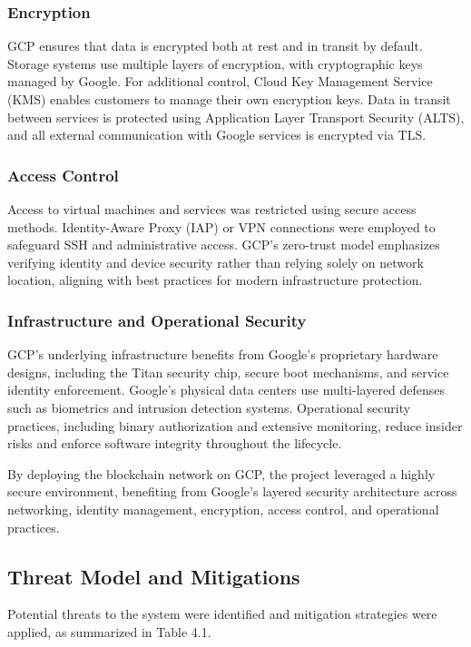 \subsubsection{Encryption}
GCP ensures that data is encrypted both at rest and in transit by default. Storage systems use multiple layers of encryption, with cryptographic keys managed by Google. For additional control, Cloud Key Management Service (KMS) enables customers to manage their own encryption keys. Data in transit between services is protected using Application Layer Transport Security (ALTS), and all external communication with Google services is encrypted via TLS.

\subsubsection{Access Control}
Access to virtual machines and services was restricted using secure access methods. Identity-Aware Proxy (IAP) or VPN connections were employed to safeguard SSH and administrative access. GCP’s zero-trust model emphasizes verifying identity and device security rather than relying solely on network location, aligning with best practices for modern infrastructure protection.

\subsubsection{Infrastructure and Operational Security}
GCP's underlying infrastructure benefits from Google's proprietary hardware designs, including the Titan security chip, secure boot mechanisms, and service identity enforcement. Google's physical data centers use multi-layered defenses such as biometrics and intrusion detection systems. Operational security practices, including binary authorization and extensive monitoring, reduce insider risks and enforce software integrity throughout the lifecycle.

By deploying the blockchain network on GCP, the project leveraged a highly secure environment, benefiting from Google’s layered security architecture across networking, identity management, encryption, access control, and operational practices.

\subsection{Threat Model and Mitigations}
Potential threats to the system were identified and mitigation strategies were applied, as summarized in Table 4.1.

